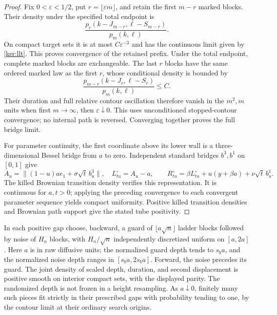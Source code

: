 \documentclass[11pt]{article}
\numberwithin{equation}{section}
\theoremstyle{definition}
\theoremstyle{remark}
\newcommand{\1}{\mathbf 1}
\begin{document}
\begin{proof}
Fix \(0<\varepsilon<1/2\), put \(r=\lfloor\varepsilon m\rfloor\),
and retain the first \(m-r\) marked blocks.  Their density under the
specified total endpoint is
\begin{equation}
 \frac{p_r(k-J_{m-r},\ell-S_{m-r})}{p_m(k,\ell)}.
 \label{ker:prefix-tilt}
\end{equation}
On compact target sets it is at most \(C\varepsilon^{-3}\) and has
the continuous limit given by \eqref{ker:llt}.  This proves
convergence of the retained prefix.  Under the total endpoint,
complete marked blocks are exchangeable.  The last \(r\) blocks have
the same ordered marked law as the first \(r\), whose conditional
density is bounded by
\[
 \frac{p_{m-r}(k-J_r,\ell-S_r)}{p_m(k,\ell)}\le C.
\]
Their duration and full relative contour oscillation therefore
vanish in the \(m^2,m\) units when first \(m\to\infty\), then
\(\varepsilon\downarrow0\).  This uses unconditioned stopped-contour
convergence; no internal path is reversed.  Converging together proves
the full bridge limit.

For parameter continuity, the first coordinate above its lower wall
is a three-dimensional Bessel bridge from \(a\) to zero.
Independent standard bridges \(b^3,b^1\) on \([0,1]\) give
\[
 A_u=\|(1-u)ae_1+\sigma\sqrt t\,b^3_u\|,\quad L^\circ_{tu}=A_u-a,
 \qquad
 R^\circ_{tu}=\beta L^\circ_{tu}+u(y+\beta a)+\nu\sqrt t\,b^1_u.
\]
The killed Brownian transition density verifies this representation.
It is continuous for \(a,t>0\); applying the preceding convergence
to each convergent parameter sequence yields compact uniformity.
Positive killed transition densities and Brownian path support give
the stated tube positivity.
\end{proof}

In each positive gap choose, backward, a guard of
\(\lfloor a\sqrt n\rfloor\) ladder blocks followed by noise of
\(H_n\) blocks, with \(H_n/\sqrt n\) independently discretized uniform
on \([a,2a]\).  Here \(a\) is in raw diffusive units; the normalized
guard depth tends to \(s_ba\), and the normalized noise depth ranges
in \([s_ba,2s_ba]\).  Forward, the noise precedes its guard.
The joint density of scaled depth, duration, and second displacement
is positive smooth on interior compact sets, with the displayed
parity.  The randomized depth is not frozen in a height resampling.
As \(a\downarrow0\), finitely many such pieces fit strictly in their
prescribed gaps with probability tending to one, by the contour
limit at their ordinary search origins.
\end{document}
